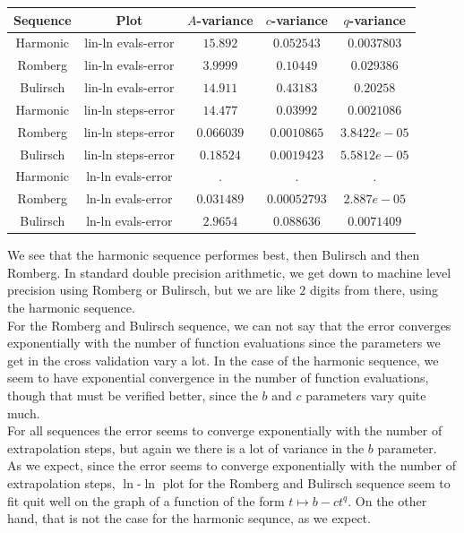 \begin{table}[H]
    \centering
    \begin{tabular}{c|c||c|c|c}
Sequence & Plot & \(A\)-variance & \(c\)-variance & \(q\)-variance\\\hline
Harmonic & lin-ln evals-error & \(15.892\) & \(0.052543\) & \(0.0037803\) \\
Romberg & lin-ln evals-error & \(3.9999\) & \(0.10449\) & \(0.029386\) \\
Bulirsch & lin-ln evals-error & \(14.911\) & \(0.43183\) & \(0.20258\) \\
Harmonic & lin-ln steps-error & \(14.477\) & \(0.03992\) & \(0.0021086\) \\
Romberg & lin-ln steps-error & \(0.066039\) & \(0.0010865\) & \(3.8422e-05\) \\
Bulirsch & lin-ln steps-error & \(0.18524\) & \(0.0019423\) & \(5.5812e-05\) \\
Harmonic & ln-ln evals-error & . & . & . \\
Romberg & ln-ln evals-error & \(0.031489\) & \(0.00052793\) & \(2.887e-05\) \\
Bulirsch & ln-ln evals-error & \(2.9654\) & \(0.088636\) & \(0.0071409\) \\
    \end{tabular}
    \label{tab:my_label}
\end{table}

We see that the harmonic sequence performes best, then Bulirsch and then Romberg. In standard double precision arithmetic, we get down to machine level precision using Romberg or Bulirsch, but we are like \(2\) digits from there, using the harmonic sequence.\\

For the Romberg and Bulirsch sequence, we can not say that the error converges exponentially with the number of function evaluations since the parameters we get in the cross validation vary a lot. In the case of the harmonic sequence, we seem to have exponential convergence in the number of function evaluations, though that must be verified better, since the \(b\) and \(c\) parameters vary quite much.\\

For all sequences the error seems to converge exponentially with the number of extrapolation steps, but again we there is a lot of variance in the \(b\) parameter.\\

As we expect, since the error seems to converge exponentially with the number of extrapolation steps, \(\ln\)-\(\ln\) plot for the Romberg and Bulirsch sequence seem to fit quit well on the graph of a function of the form \(t \mapsto b - c t^q\). On the other hand, that is not the case for the harmonic sequnce, as we expect.

